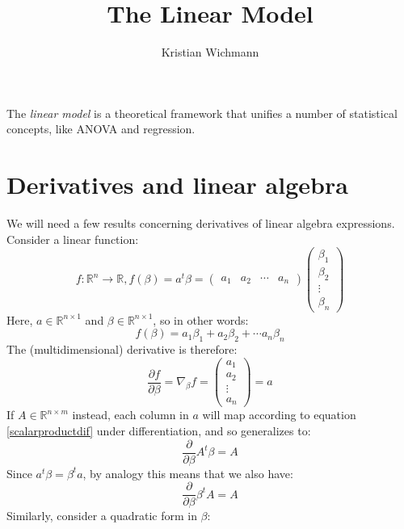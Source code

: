 \documentclass[12pt, a4paper]{article}
\title{The Linear Model}
\author{Kristian Wichmann}
\numberwithin{equation}{section}
\begin{document}
\maketitle

The \textit{linear model} is a theoretical framework that unifies a number of statistical concepts, like ANOVA and regression.

\section{Derivatives and linear algebra}
We will need a few results concerning derivatives of linear algebra expressions. Consider a linear function:
\begin{equation}
f: \mathbb{R}^n\rightarrow\mathbb{R}, f(\beta)=a^t\beta=
\begin{pmatrix}
a_1 & a_2 & \cdots & a_n
\end{pmatrix}
\begin{pmatrix}
\beta_1 \\ \beta_2 \\ \vdots \\ \beta_n
\end{pmatrix}
\end{equation}
Here, $a\in\mathbb{R}^{n\times 1}$ and $\beta\in\mathbb{R}^{n\times 1}$, so in other words:
\begin{equation}
f(\beta)=a_1\beta_1+a_2\beta_2+\cdots a_n\beta_n
\end{equation}
The (multidimensional) derivative is therefore:
\begin{equation}
\label{scalarproductdif}
\frac{\partial f}{\partial \beta}=\nabla_\beta f=
\begin{pmatrix}
a_1 \\ a_2 \\ \vdots \\ a_n
\end{pmatrix}
=a
\end{equation}
If $A\in\mathbb{R}^{n\times m}$ instead, each column in $a$ will map according to equation \ref{scalarproductdif} under differentiation, and so generalizes to:
\begin{equation}
\label{matrixdif}
\frac{\partial}{\partial\beta}A^t\beta = A
\end{equation}
Since $a^t\beta=\beta^t a$, by analogy this means that we also have:
\begin{equation}
\label{matrixdif2}
\frac{\partial}{\partial\beta}\beta^t A = A
\end{equation}
Similarly, consider a quadratic form in $\beta$:
\end{document}
